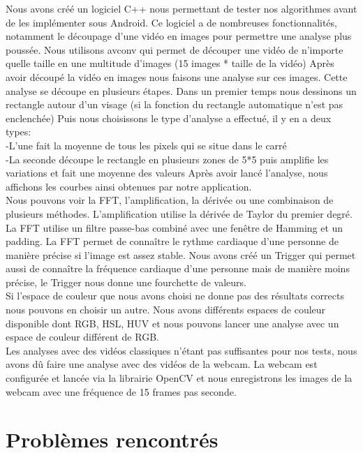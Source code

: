 	Nous avons créé un logiciel C++ nous permettant de tester nos algorithmes avant de les implémenter sous Android.
	Ce logiciel a de nombreuses fonctionnalités, notamment le découpage d'une vidéo en images pour permettre une analyse plus poussée.
	Nous utilisons avconv qui permet de découper une vidéo de n'importe quelle taille en une multitude d'images (15 images * taille de la vidéo)
	Après avoir découpé la vidéo en images nous faisons une analyse sur ces images.
	Cette analyse se découpe en plusieurs étapes.
	Dans un premier temps nous dessinons un rectangle autour d'un visage (si la fonction du rectangle automatique n'est pas enclenchée)
	Puis nous choisissons le type d'analyse a effectué, il y en a deux types:\\
		-L'une fait la moyenne de tous les pixels qui se situe dans le carré\\
		-La seconde découpe le rectangle en plusieurs zones de 5*5 puis amplifie les variations et fait une moyenne des valeurs
	Après avoir lancé l'analyse, nous affichons les courbes ainsi obtenues par notre application.\\

	Nous pouvons voir la FFT, l'amplification, la dérivée ou une combinaison de plusieurs méthodes.
	L'amplification utilise la dérivée de Taylor du premier degré.
	La FFT utilise un filtre passe-bas combiné avec une fenêtre de Hamming et un padding.
	La FFT permet de connaître le rythme cardiaque d'une personne de manière précise si l'image est assez stable.
	Nous avons créé un Trigger qui permet aussi de connaître la fréquence cardiaque d'une personne mais de manière moins précise, le Trigger nous donne une fourchette de valeurs.\\

	Si l'espace de couleur que nous avons choisi ne donne pas des résultats corrects nous pouvons en choisir un autre.
	Nous avons différents espaces de couleur disponible dont RGB, HSL, HUV et nous pouvons lancer une analyse avec un espace de couleur différent de RGB.\\

	Les analyses avec des vidéos classiques n'étant pas suffisantes pour nos tests, nous avons dû faire une analyse avec des vidéos de la webcam.
	La webcam est configurée et lancée via la librairie OpenCV et nous enregistrons les images de la webcam avec une fréquence de 15 frames pas seconde.\\

\section{Problèmes rencontrés}

